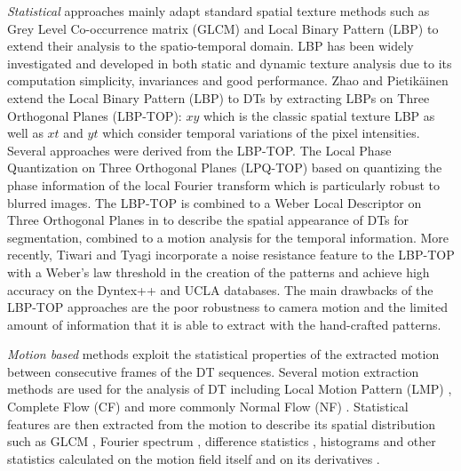 \documentclass[a4paper,11pt]{article}
\begin{document}
\textit{Statistical} approaches \cite{zhao2007dynamic,flores2005identifying,tiwari2016improved,tiwari2016dynamic,rahtu2012local,chen2013automatic,yang2016dynamic} mainly adapt standard spatial texture methods such as Grey Level Co-occurrence matrix (GLCM) \cite{haralick1973textural} and Local Binary Pattern (LBP) \cite{ojala1996comparative} to extend their analysis to the spatio-temporal domain. 
LBP has been widely investigated and developed in both static and dynamic texture analysis due to its computation simplicity, invariances and good performance. 
Zhao and Pietik\"ainen \cite{zhao2007dynamic} extend the Local Binary Pattern (LBP) to DTs by extracting LBPs on Three Orthogonal Planes (LBP-TOP):
$xy$ which is the classic spatial texture LBP as well as $xt$ and $yt$ which consider temporal variations of the pixel intensities.
Several approaches were derived from the LBP-TOP. The Local Phase Quantization on Three Orthogonal Planes (LPQ-TOP) \cite{rahtu2012local} based on
quantizing the phase information of the local Fourier transform which is particularly robust to blurred images. 
The LBP-TOP is combined to a Weber Local Descriptor on Three Orthogonal Planes in \cite{chen2013automatic} to describe the spatial appearance of DTs for segmentation, combined to a motion analysis for the temporal information.
More recently, Tiwari and Tyagi \cite{tiwari2016improved} incorporate a noise resistance feature to the LBP-TOP with a Weber's law
threshold in the creation of the patterns and achieve high accuracy on the Dyntex++ \cite{ghanem2010maximum} and UCLA \cite{doretto2003dynamic} databases.
The main drawbacks of the LBP-TOP approaches are the poor robustness to camera motion and the limited amount of information that it is able to extract with the hand-crafted patterns.

\textit{Motion based} methods exploit the statistical properties of the extracted motion between consecutive frames of the DT sequences.
Several motion extraction methods are used for the analysis of DT including Local Motion Pattern (LMP) \cite{gao2008extended}, Complete Flow (CF) \cite{chen2013automatic,andrearczyk2015dynamic} and more commonly Normal Flow (NF) \cite{peh2002synergizing,peteri2005dynamic,fazekas2005normal,fazekas2007dynamic,lu2005dynamic,bouthemy1998motion}.
Statistical features are then extracted from the motion to describe its spatial distribution such as GLCM \cite{andrearczyk2015dynamic,peh2002synergizing,bouthemy1998motion},
Fourier spectrum \cite{peh2002synergizing}, difference statistics \cite{peh2002synergizing}, histograms \cite{chen2013automatic,gao2008extended,lu2005dynamic}
and other statistics calculated on the motion field itself \cite{peteri2005dynamic} and on its derivatives \cite{fazekas2007dynamic}.
\end{document}
